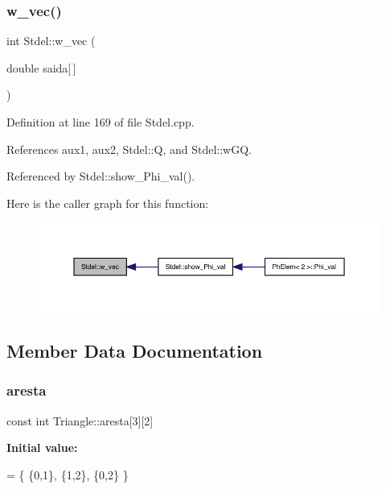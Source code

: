 \subsubsection{\texorpdfstring{w\+\_\+vec()}{w\_vec()}}
{\footnotesize\ttfamily int Stdel\+::w\+\_\+vec (\begin{DoxyParamCaption}\item[{double}]{saida\mbox{[}$\,$\mbox{]} }\end{DoxyParamCaption})\hspace{0.3cm}{\ttfamily [inherited]}}



Definition at line 169 of file Stdel.\+cpp.



References aux1, aux2, Stdel\+::Q, and Stdel\+::w\+GQ.



Referenced by Stdel\+::show\+\_\+\+Phi\+\_\+val().

Here is the caller graph for this function\+:
\nopagebreak
\begin{figure}[H]
\begin{center}
\leavevmode
\includegraphics[width=350pt]{classStdel_a395c8d7d7890a9efdea23932fa22b420_icgraph}
\end{center}
\end{figure}


\subsection{Member Data Documentation}
\mbox{\label{classTriangle_a4f19e62f5f4ca0e2a8f3747401eb2a44}} 
\subsubsection{\texorpdfstring{aresta}{aresta}}
{\footnotesize\ttfamily const int Triangle\+::aresta\mbox{[}3\mbox{]}\mbox{[}2\mbox{]}\hspace{0.3cm}{\ttfamily [private]}}

{\bfseries Initial value\+:}
\begin{DoxyCode}
=
  \{ \{0,1\},
    \{1,2\},
    \{0,2\}
  \}
\end{DoxyCode}


